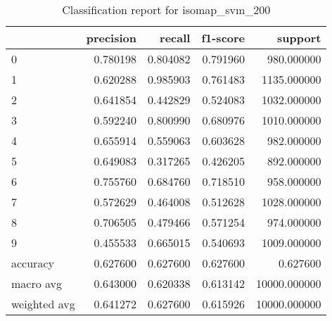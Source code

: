 \begin{table}[htb!]
\centering
\caption{Classification report for isomap_svm_200}
\label{tab:classification-report-isomap_svm_200}
\begin{tabular}{lrrrr}
\toprule
 & precision & recall & f1-score & support \\
\midrule
0 & 0.780198 & 0.804082 & 0.791960 & 980.000000 \\
1 & 0.620288 & 0.985903 & 0.761483 & 1135.000000 \\
2 & 0.641854 & 0.442829 & 0.524083 & 1032.000000 \\
3 & 0.592240 & 0.800990 & 0.680976 & 1010.000000 \\
4 & 0.655914 & 0.559063 & 0.603628 & 982.000000 \\
5 & 0.649083 & 0.317265 & 0.426205 & 892.000000 \\
6 & 0.755760 & 0.684760 & 0.718510 & 958.000000 \\
7 & 0.572629 & 0.464008 & 0.512628 & 1028.000000 \\
8 & 0.706505 & 0.479466 & 0.571254 & 974.000000 \\
9 & 0.455533 & 0.665015 & 0.540693 & 1009.000000 \\
accuracy & 0.627600 & 0.627600 & 0.627600 & 0.627600 \\
macro avg & 0.643000 & 0.620338 & 0.613142 & 10000.000000 \\
weighted avg & 0.641272 & 0.627600 & 0.615926 & 10000.000000 \\
\bottomrule
\end{tabular}
\end{table}
